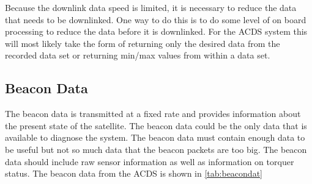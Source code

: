 Because the downlink data speed is limited, it is necessary to reduce the data that needs to be downlinked. One way to do this is to do some level of on board processing to reduce the data before it is downlinked. For the \ac{ACDS} system this will most likely take the form of returning only the desired data from the recorded data set or returning min/max values from within a data set. 

\subsection{Beacon Data}

The beacon data is transmitted at a fixed rate and provides information about the present state of the satellite. The beacon data could be the only data that is available to diagnose the system. The beacon data must contain enough data to be useful but not so much data that the beacon packets are too big. The beacon data should include raw sensor information as well as information on torquer status. The beacon data from the \ac{ACDS} is shown in \cref{tab:beacondat}

\begin{comment}
\begin{itemize}
    \item current magnetometer and gyro readings
    \item current torquer status
    \item number of torquer flips so far \todo[inline]{in each axis?}
    \item flags for errors
    \item mode
    \item Kalman filter status
    \item Kalman filter attitude
    \item \todo[inline]{More?}
\end{itemize}
\end{comment}

